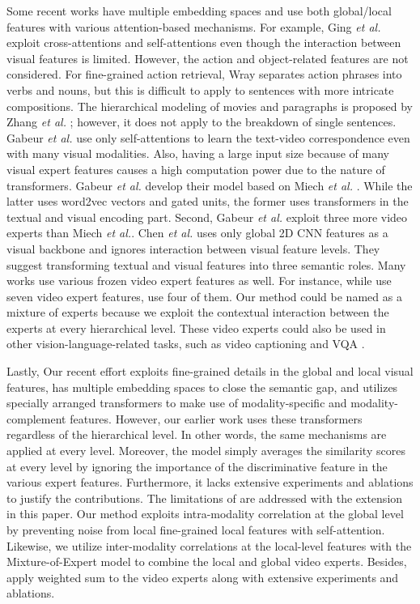 \documentclass[lettersize,journal]{IEEEtran}
\begin{document}
Some recent works have multiple embedding spaces and use both global/local features with various attention-based mechanisms. For example, Ging \textit{et al.} \cite{coot} exploit cross-attentions and self-attentions even though the interaction between visual features is limited. However, the action and object-related features are not considered. For fine-grained action retrieval, Wray separates action phrases into verbs and nouns, but this is difficult to apply to sentences with more intricate compositions. The hierarchical modeling of movies and paragraphs is proposed by Zhang \textit{et al.} \cite{zhang_hierarch}; however, it does not apply to the breakdown of single sentences. Gabeur \textit{et al.} \cite{gabeur2020mmt} use only self-attentions to learn the text-video correspondence even with many visual modalities. Also, having a large input size because of many visual expert features causes a high computation power due to the nature of transformers. Gabeur \textit{et al.} \cite{gabeur2020mmt} develop their model based on Miech \textit{et al.} \cite{miech18learning}. While the latter uses word2vec vectors and gated units, the former uses transformers in the textual and visual encoding part. Second, Gabeur \textit{et al.} exploit three more video experts than Miech \textit{et al.}. Chen \textit{et al.} \cite{Chen_2020_CVPR} uses only global 2D CNN features as a visual backbone and ignores interaction between visual feature levels. They suggest transforming textual and visual features into three semantic roles. Many works use various frozen video expert features as well. For instance, while \cite{Liu2019a, gabeur2020mmt} use seven video expert features, \cite{Gabeur2022Masking, miech18learning} use four of them. Our method could be named as a mixture of experts because we exploit the contextual interaction between the experts at every hierarchical level. These video experts could also be used in other vision-language-related tasks, such as video captioning \cite{MDVC_Iashin_2020} and VQA \cite{vlmo}.

Lastly, Our recent effort \cite{satar_2021} exploits fine-grained details in the global and local visual features, has multiple embedding spaces to close the semantic gap, and utilizes specially arranged transformers to make use of modality-specific and modality-complement features. However, our earlier work uses these transformers regardless of the hierarchical level. In other words, the same mechanisms are applied at every level. Moreover, the model simply averages the similarity scores at every level by ignoring the importance of the discriminative feature in the various expert features. Furthermore, it lacks extensive experiments and ablations to justify the contributions. The limitations of \cite{satar_2021} are addressed with the extension in this paper. Our method exploits intra-modality correlation at the global level by preventing noise from local fine-grained local features with self-attention. Likewise, we utilize inter-modality correlations at the local-level features with the Mixture-of-Expert model to combine the local and global video experts. Besides, apply weighted sum to the video experts along with extensive experiments and ablations.
\end{document}
